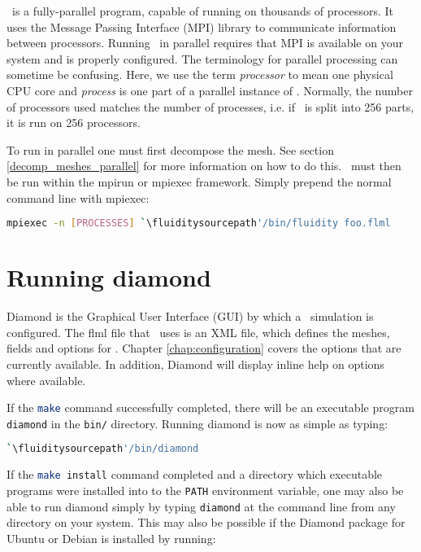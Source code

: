 \fluidity\ is a fully-parallel program, capable of running on thousands of
processors.  It uses the Message Passing Interface (MPI) library to communicate
information between processors. Running \fluidity\ in parallel requires that
MPI is available on your system and is properly configured. The terminology for
parallel processing can sometime be confusing.  Here, we use the term
\emph{processor} to mean one physical CPU core and \emph{process} is one part
of a parallel instance of \fluidity. Normally, the number of processors used
matches the number of processes, i.e. if \fluidity\ is split into 256 parts, it
is run on 256 processors.

To run in parallel one must first decompose the mesh. See section
\ref{decomp_meshes_parallel} for more information on how to do this. \fluidity\
must then be run within the mpirun or mpiexec framework. Simply prepend the
normal command line with mpiexec:
\begin{lstlisting}[language=bash]
mpiexec -n [PROCESSES] `\fluiditysourcepath'/bin/fluidity foo.flml
\end{lstlisting}

\section{Running diamond}
\label{sec:running_diamond}

Diamond is the Graphical User Interface (GUI) by which a \fluidity\ simulation
is configured. The flml file that \fluidity\ uses is an XML file, which defines
the meshes, fields and options for \fluidity. Chapter \ref{chap:configuration}
covers the options that are currently available. In addition, Diamond will
display inline help on options where available.

If the \lstinline[language=Bash]+make+ command successfully completed, there
will be an executable program \lstinline[language=Bash]+diamond+ in the
\lstinline[language=Bash]+bin/+ directory. Running diamond is now as simple as
typing:

\begin{lstlisting}[language=Bash]
`\fluiditysourcepath'/bin/diamond
\end{lstlisting}

If the \lstinline[language=Bash]+make install+ command completed and a directory
which executable programs were installed into to the
\lstinline[language=Bash]+PATH+ environment variable, one may also be able to run
diamond simply by typing \lstinline[language=Bash]+diamond+ at the command line
from any directory on your system. This may also be possible if the
Diamond package for Ubuntu or Debian is installed by running:


